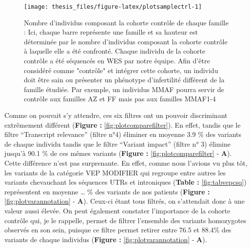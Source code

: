 \documentclass[12pt,twoside]{reedthesis}
\theoremstyle{definition}
\theoremstyle{definition}
\theoremstyle{remark}
\begin{document}
  \begin{figure}
  
  {\centering \texttt{[image: thesis\_files/figure-latex/plotsamplectrl-1]} 
  
  }
  
  \caption[Nombre d'individus composant la cohorte contrôle de chaque famille]{Nombre d'individus composant la cohorte contrôle de chaque famille : Ici, chaque barre représente une famille et sa hauteur est déterminée par le nombre d'individus composant la cohorte contrôle à laquelle elle a été confronté. Chaque individu de la cohorte contrôle a été séquencés en WES par notre équipe. Afin d'être considéré comme "contrôle" et intégrer cette cohorte, un individu doit être sain ou présenter un phénotype d'infertilité différent de la famille étudiée. Par exemple, un individus MMAF pourra servir de contrôle aux familles AZ et FF mais pas aux familles MMAF1-4}\label{fig:plotsamplectrl}
  \end{figure}
  
  \newpage
  
  \newpage
  
  Comme on pouvait s'y attendre, ces six filtres ont un pouvoir
  discriminant extrêmement différent (\textbf{Figure :}
  \ref{fig:plotcomparefilter}). En effet, tandis que le filtre
  ``Transcript relevance'' (filtre n°4) éliminer en moyenne 3.9 \% des
  variants de chaque individu tandis que le filtre ``Variant impact''
  (filtre n° 3) élimine jusqu'à 90.1 \% de ces mêmes variants
  (\textbf{Figure :} \ref{fig:plotcomparefilter} - \textbf{A}). Cette
  différence n'est pas surprenante. En effet, comme nous l'avions vu plus
  tôt, les variants de la catégorie VEP MODIFIER qui regroupe entre autres
  les variants chevauchant les séquences UTRs et introniques
  (\textbf{Table :} \ref{fig:tabvepcsq}) représentent en moyenne \ldots{}
  \% des variants de nos patients (\textbf{Figure :}
  \ref{fig:plotvarannotation} - \textbf{A}). Ceux-ci étant tous filtrés,
  on s'attendait donc à une valeur aussi élevée. On peut également
  constater l'importance de la cohorte contrôle qui, je le rappelle,
  permet de filtrer l'ensemble des variants homozygotes observés en son
  sein, puisque ce filtre permet retirer entre 76.5 et 88.4\% des variants
  de chaque individus (\textbf{Figure :} \ref{fig:plotvarannotation} -
  \textbf{A}).
  
\end{document}
